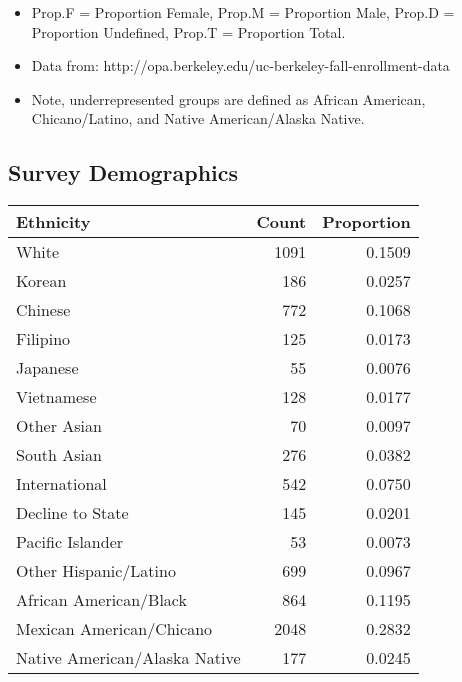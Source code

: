 \documentclass{article}\usepackage[]{graphicx}\usepackage[]{color}
\begin{document}
\begin{itemize}
\item Prop.F = Proportion Female, Prop.M = Proportion Male, Prop.D = Proportion Undefined, Prop.T = Proportion Total.
\item Data from: http://opa.berkeley.edu/uc-berkeley-fall-enrollment-data
\item Note, underrepresented groups are defined as African American, Chicano/Latino, and Native American/Alaska Native.
\end{itemize}

\subsection{Survey Demographics}
\begin{table}[ht]
\centering
\begin{tabular}{lrr}
  \hline
Ethnicity & Count & Proportion \\ 
  \hline
                         White & 1091 & 0.1509 \\ 
                          Korean & 186 & 0.0257 \\ 
                         Chinese & 772 & 0.1068 \\ 
                        Filipino & 125 & 0.0173 \\ 
                        Japanese & 55 & 0.0076 \\ 
                      Vietnamese & 128 & 0.0177 \\ 
                     Other Asian & 70 & 0.0097 \\ 
                     South Asian & 276 & 0.0382 \\ 
                   International & 542 & 0.0750 \\ 
                Decline to State & 145 & 0.0201 \\ 
                Pacific Islander & 53 & 0.0073 \\ 
           Other Hispanic/Latino & 699 & 0.0967 \\ 
          African American/Black & 864 & 0.1195 \\ 
        Mexican American/Chicano & 2048 & 0.2832 \\ 
   Native American/Alaska Native & 177 & 0.0245 \\ 
   \hline
\end{tabular}
\end{table}
\end{document}
